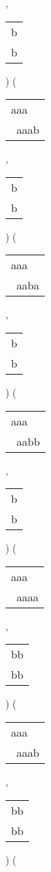 \begin{description}
\begin{tabular}{|l|}
\end{tabular} 
 , 
\begin{tabular}{|l|} \hline
b \\
b \\
\hline
\end{tabular} 
) 
 ( 
\begin{tabular}{|l|} \hline
aaa\ \  \\
\ aaab \\
\hline
\end{tabular} 
 , 
\begin{tabular}{|l|} \hline
b \\
b \\
\hline
\end{tabular} 
) 
 ( 
\begin{tabular}{|l|} \hline
aaa\ \  \\
\ aaba \\
\hline
\end{tabular} 
 , 
\begin{tabular}{|l|} \hline
b \\
b \\
\hline
\end{tabular} 
) 
 ( 
\begin{tabular}{|l|} \hline
aaa\ \  \\
\ aabb \\
\hline
\end{tabular} 
 , 
\begin{tabular}{|l|} \hline
b \\
b \\
\hline
\end{tabular} 
) 
 ( 
\begin{tabular}{|l|} \hline
aaa\ \  \\
\ aaaa \\
\hline
\end{tabular} 
 , 
\begin{tabular}{|l|} \hline
bb \\
bb \\
\hline
\end{tabular} 
) 
 ( 
\begin{tabular}{|l|} \hline
aaa\ \  \\
\ aaab \\
\hline
\end{tabular} 
 , 
\begin{tabular}{|l|} \hline
bb \\
bb \\
\hline
\end{tabular} 
) 
 ( 

\end{description}
